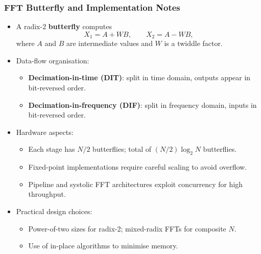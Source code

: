 \begin{frame}
	\frametitle{FFT Butterfly and Implementation Notes}
	\begin{itemize}
		\item A radix-2 \textbf{butterfly} computes
		\begin{equation}
			X_1 = A + W B, \qquad X_2 = A - W B,
		\end{equation}
		where $A$ and $B$ are intermediate values and $W$ is a twiddle factor.
		\item Data-flow organisation:
		\begin{itemize}
			\item \textbf{Decimation-in-time (DIT)}: split in time domain, outputs appear in bit-reversed order.
			\item \textbf{Decimation-in-frequency (DIF)}: split in frequency domain, inputs in bit-reversed order.
		\end{itemize}
		\item Hardware aspects:
		\begin{itemize}
			\item Each stage has $N/2$ butterflies; total of $(N/2)\log_2 N$ butterflies.
			\item Fixed-point implementations require careful scaling to avoid overflow.
			\item Pipeline and systolic FFT architectures exploit concurrency for high throughput.
		\end{itemize}
		\item Practical design choices:
		\begin{itemize}
			\item Power-of-two sizes for radix-2; mixed-radix FFTs for composite $N$.
			\item Use of in-place algorithms to minimise memory.
		\end{itemize}
	\end{itemize}
\end{frame}

